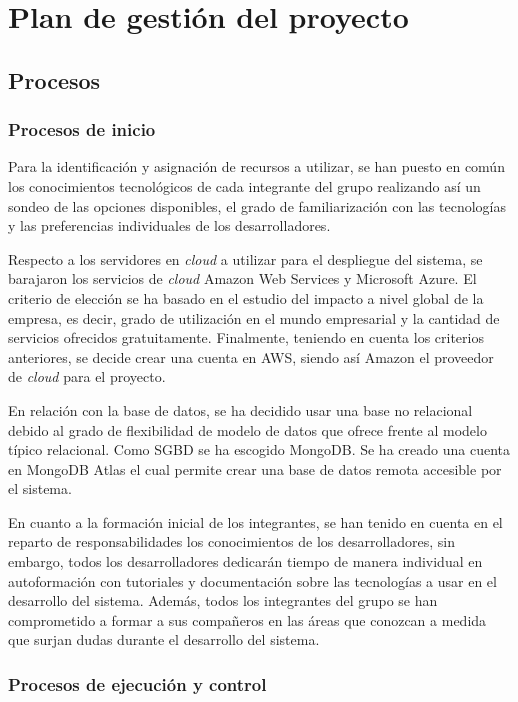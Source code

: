 \documentclass{article}
\begin{document}
\section{Plan de gestión del proyecto}

\subsection{Procesos}

\subsubsection{Procesos de inicio}

Para la identificación y asignación de recursos a utilizar, se han puesto en común los conocimientos tecnológicos de cada integrante del grupo realizando así un sondeo de las opciones disponibles, el grado de familiarización con las tecnologías y las preferencias individuales de los desarrolladores. 

Respecto a los servidores en \textit{cloud} a utilizar para el despliegue del sistema, se barajaron los servicios de \textit{cloud} Amazon Web Services y Microsoft Azure. El criterio de elección se ha basado en el estudio del impacto a nivel global de la empresa, es decir, grado de utilización en el mundo empresarial y la cantidad de servicios ofrecidos gratuitamente. Finalmente, teniendo en cuenta los criterios anteriores, se decide crear una cuenta en AWS, siendo así Amazon el proveedor de \textit{cloud} para el proyecto.

\pagebreak
En relación con la base de datos, se ha decidido usar una base no relacional debido al grado de flexibilidad de modelo de datos que ofrece frente al modelo típico relacional. Como SGBD se ha escogido MongoDB. Se ha creado una cuenta en MongoDB Atlas el cual permite crear una base de datos remota accesible
por el sistema.

En cuanto a la formación inicial de los integrantes, se han tenido en cuenta en el reparto de responsabilidades los conocimientos de los desarrolladores, sin embargo, todos los desarrolladores dedicarán tiempo de manera individual en autoformación con tutoriales y documentación sobre las tecnologías a usar en el desarrollo del sistema. Además, todos los integrantes del grupo se han comprometido a formar a sus compañeros en las áreas que conozcan a medida que surjan dudas durante el desarrollo del sistema.

\subsubsection{Procesos de ejecución y control}
\end{document}
